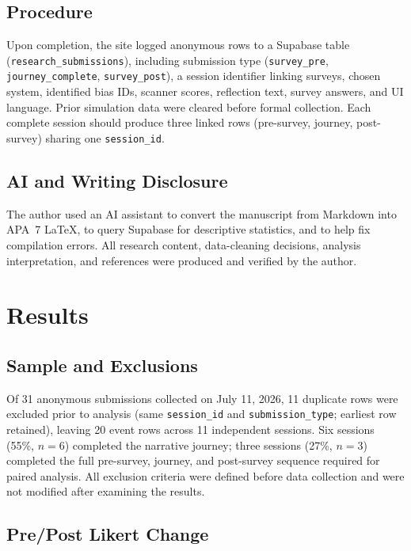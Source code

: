 \documentclass[stu,12pt,floatsintext]{apa7}
\begin{document}
\subsection{Procedure}

Upon completion, the site logged anonymous rows to a Supabase table (\texttt{research\_submissions}), including submission type (\texttt{survey\_pre}, \texttt{journey\_complete}, \texttt{survey\_post}), a session identifier linking surveys, chosen system, identified bias IDs, scanner scores, reflection text, survey answers, and UI language. Prior simulation data were cleared before formal collection. Each complete session should produce three linked rows (pre-survey, journey, post-survey) sharing one \texttt{session\_id}.

\subsection{AI and Writing Disclosure}

The author used an AI assistant to convert the manuscript from Markdown into APA~7 \LaTeX{}, to query Supabase for descriptive statistics, and to help fix compilation errors. All research content, data-cleaning decisions, analysis interpretation, and references were produced and verified by the author.

\section{Results}

\subsection{Sample and Exclusions}

Of 31 anonymous submissions collected on July 11, 2026, 11 duplicate rows were excluded prior to analysis (same \texttt{session\_id} and \texttt{submission\_type}; earliest row retained), leaving 20 event rows across 11 independent sessions. Six sessions (55\%, $n = 6$) completed the narrative journey; three sessions (27\%, $n = 3$) completed the full pre-survey, journey, and post-survey sequence required for paired analysis. All exclusion criteria were defined before data collection and were not modified after examining the results.

\subsection{Pre/Post Likert Change}
\end{document}
